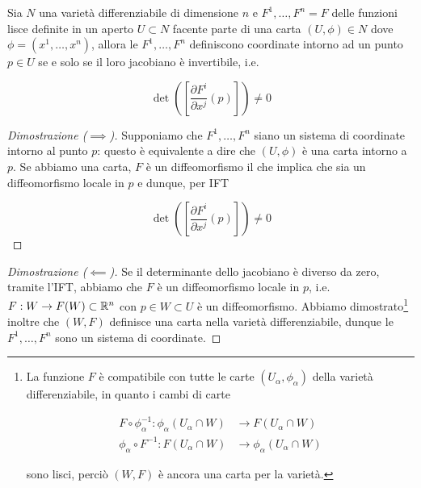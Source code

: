 \begin{corollary}[IFT]\label{ift-cor}
	Sia $ N $ una varietà differenziabile di dimensione $ n $ e $ F^{1},\dots,F^{n} = F $ delle funzioni lisce definite in un aperto $ U \subset N $ facente parte di una carta $ (U,\phi) \in N $ dove $ \phi = (x^{1},\dots,x^{n}) $, allora le $ F^{1},\dots,F^{n} $ definiscono coordinate intorno ad un punto $ p \in U $ se e solo se il loro jacobiano è invertibile, i.e.
	
	\begin{equation}
		\det( \left[ \dfrac{\partial F^{i}}{\partial x^{j}} (p) \right] ) \neq 0
	\end{equation}
\end{corollary}

\begin{proof}[Dimostrazione ($ \implies $)]
	Supponiamo che $ F^{1},\dots,F^{n} $ siano un sistema di coordinate intorno al punto $ p $: questo è equivalente a dire che $ (U,\phi) $ è una carta intorno a $ p $. Se abbiamo una carta, $ F $ è un diffeomorfismo il che implica che sia un diffeomorfismo locale in $ p $ e dunque, per IFT
	
	\begin{equation}
		\det( \left[ \dfrac{\partial F^{i}}{\partial x^{j}} (p) \right] ) \neq 0
	\end{equation}
\end{proof}

\begin{proof}[Dimostrazione ($ \impliedby $)]
	Se il determinante dello jacobiano è diverso da zero, tramite l'IFT, abbiamo che $ F $ è un diffeomorfismo locale in $ p $, i.e. $ F : W \to F(W) \subset \mathbb{R}^{n} $ con $ p \in W \subset U $ è un diffeomorfismo. Abbiamo dimostrato\footnote{%
		La funzione $ F $ è compatibile con tutte le carte $ (U_{\alpha},\phi_{\alpha}) $ della varietà differenziabile, in quanto i cambi di carte
		
		\begin{align*}
				F \circ \phi_{\alpha}^{-1} : \phi_{\alpha}(U_{\alpha} \cap W) &\to F(U_{\alpha} \cap W)\\
				\phi_{\alpha} \circ F^{-1} : F(U_{\alpha} \cap W) &\to \phi_{\alpha}(U_{\alpha} \cap W)
		\end{align*}
		
		sono lisci, perciò $ (W,F) $ è ancora una carta per la varietà.%
	} inoltre che $ (W,F) $ definisce una carta nella varietà differenziabile, dunque le $ F^{1},\dots,F^{n} $ sono un sistema di coordinate.
\end{proof}

